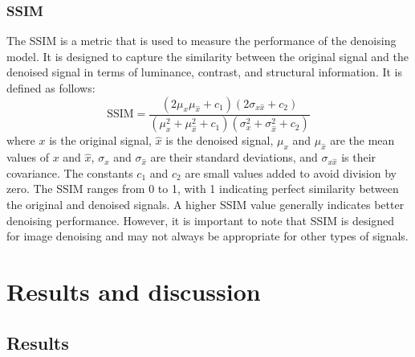 \documentclass[a4paper]{sapthesis}
\begin{document}
\subsubsection{SSIM}
The SSIM is a metric that is used to measure the performance of the
denoising model. It is designed to capture the similarity between the 
original signal and the denoised signal in terms of luminance, 
contrast, and structural information. It is defined as follows:
\begin{equation}
\text{SSIM} = \frac{(2\mu_x\mu_{\hat{x}} + c_1)(2\sigma_{x {\hat{x}}} + c_2)}{(\mu_x^2 + \mu_{\hat{x}}^2 + c_1)(\sigma_x^2 + \sigma_{\hat{x}}^2 + c_2)}
\end{equation}
where $x$ is the original signal, $\hat{x}$ is the denoised signal, 
$\mu_x$ and $\mu_{\hat{x}}$ are the mean values of $x$ and $\hat{x}$, 
$\sigma_x$ and $\sigma_{\hat{x}}$ are their standard deviations, and 
$\sigma_{x\hat{x}}$ is their covariance. The constants $c_1$ and $c_2$ 
are small values added to avoid division by zero.\newline
The SSIM ranges from 0 to 1, with 1 indicating perfect similarity between 
the original and denoised signals. A higher SSIM value generally indicates 
better denoising performance. However, it is important to note that SSIM 
is designed for image denoising and may not always be appropriate for 
other types of signals.
\section{Results and discussion}
\subsection{Results}
\end{document}

